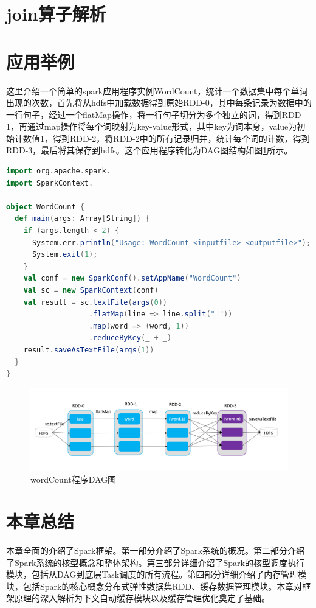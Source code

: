 \section{join算子解析}

\section{应用举例}

这里介绍一个简单的spark应用程序实例WordCount，统计一个数据集中每个单词出现的次数，首先将从hdfs中加载数据得到原始RDD-0，其中每条记录为数据中的一行句子，经过一个flatMap操作，将一行句子切分为多个独立的词，得到RDD-1，再通过map操作将每个词映射为key-value形式，其中key为词本身，value为初始计数值1，得到RDD-2，将RDD-2中的所有记录归并，统计每个词的计数，得到RDD-3，最后将其保存到hdfs。这个应用程序转化为DAG图结构如图\ref{fig:word-count}所示。

\begin{lstlisting}[language=Scala]
import org.apache.spark._
import SparkContext._

object WordCount {
  def main(args: Array[String]) {
    if (args.length < 2) {
      System.err.println("Usage: WordCount <inputfile> <outputfile>");
      System.exit(1);
    }
    val conf = new SparkConf().setAppName("WordCount")
    val sc = new SparkContext(conf)
    val result = sc.textFile(args(0))
                   .flatMap(line => line.split(" "))
                   .map(word => (word, 1))
                   .reduceByKey(_ + _)
    result.saveAsTextFile(args(1))
  }
}
\end{lstlisting}

\begin{figure}
    \centering
    \includegraphics[width=1\textwidth]{Img/spark-wordcount.png}
    \caption{wordCount程序DAG图}
    \label{fig:word-count}
\end{figure}

\section{本章总结}

本章全面的介绍了Spark框架。第一部分介绍了Spark系统的概况。第二部分介绍了Spark系统的核型概念和整体架构。第三部分详细介绍了Spark的核型调度执行模块，包括从DAG到底层Task调度的所有流程。第四部分详细介绍了内存管理模块，包括Spark的核心概念分布式弹性数据集RDD、缓存数据管理模块。本章对框架原理的深入解析为下文自动缓存模块以及缓存管理优化奠定了基础。




